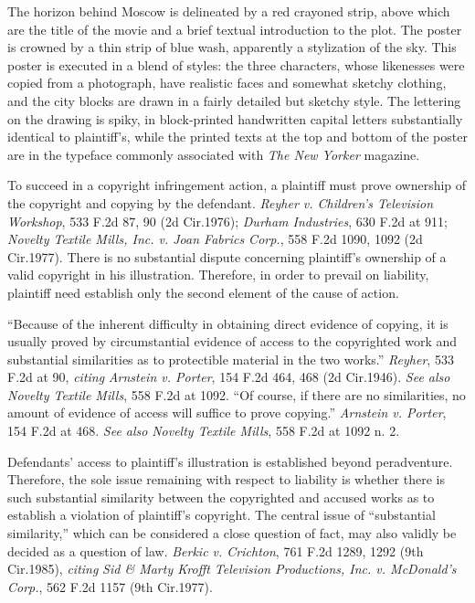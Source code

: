 The horizon behind Moscow is delineated by a red crayoned strip, above which are
the title of the movie and a brief textual introduction to the plot. The poster
is crowned by a thin strip of blue wash, apparently a stylization of the sky.
This poster is executed in a blend of styles: the three characters, whose
likenesses were copied from a photograph, have realistic faces and somewhat
sketchy clothing, and the city blocks are drawn in a fairly detailed but sketchy
style. The lettering on the drawing is spiky, in block-printed handwritten
capital letters substantially identical to plaintiff's, while the printed texts
at the top and bottom of the poster are in the  typeface commonly associated
with \textit{The New Yorker} magazine.




To succeed in a copyright infringement action, a plaintiff must prove ownership
of the copyright and copying by the defendant. \textit{Reyher v. Children's
Television Workshop}, 533 F.2d 87, 90 (2d Cir.1976); \textit{Durham Industries},
630 F.2d at 911; \textit{Novelty Textile Mills, Inc. v. Joan Fabrics Corp.}, 558
F.2d 1090, 1092 (2d Cir.1977). There is no substantial dispute concerning
plaintiff's ownership of a valid copyright in his illustration. Therefore, in
order to prevail on liability, plaintiff need establish only the second element
of the cause of action.

``Because of the inherent difficulty in obtaining direct evidence of copying, it
is usually proved by circumstantial evidence of access to the copyrighted work
and substantial similarities as to protectible material in the two works.''
\textit{Reyher}, 533 F.2d at 90, \textit{citing} \textit{Arnstein v. Porter},
154 F.2d 464, 468 (2d Cir.1946). \textit{See also} \textit{Novelty Textile
Mills}, 558 F.2d at 1092. ``Of course, if there are no similarities, no amount
of evidence of access will suffice to prove copying.'' \textit{Arnstein v.
Porter}, 154 F.2d at 468. \textit{See also} \textit{Novelty Textile Mills}, 558
F.2d at 1092 n. 2.

Defendants' access to plaintiff's illustration is established beyond
peradventure. Therefore, the sole issue remaining with respect to liability is
whether there is such substantial similarity between the copyrighted and accused
works as to establish a violation of plaintiff's copyright. The central issue of
``substantial similarity,'' which can be considered a close question of fact,
may also validly be decided as a question of law. \textit{Berkic v. Crichton},
761 F.2d 1289, 1292 (9th Cir.1985), \textit{citing} \textit{Sid \& Marty Krofft
Television Productions, Inc. v. McDonald's Corp.}, 562 F.2d 1157 (9th Cir.1977).

